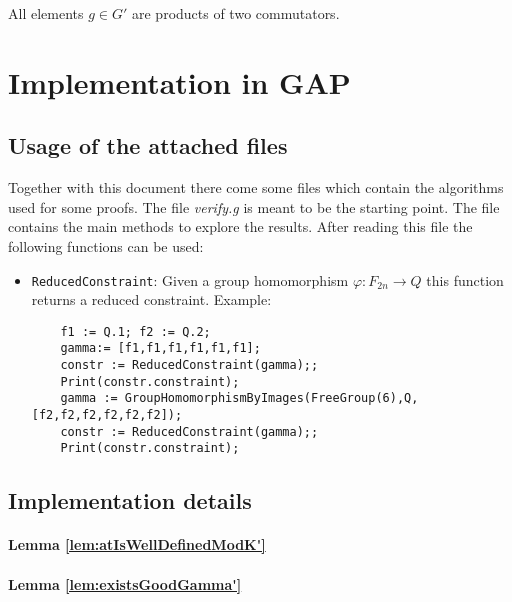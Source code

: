 \documentclass[a4paper,12pt]{article}
\begin{document}
\begin{cor}
 All elements $g\in G'$ are products of two commutators.
\end{cor}

\section{Implementation in GAP}
\subsection{Usage of the attached files}
Together with this document there come some files which contain the algorithms used for some proofs.
The file \emph{verify.g} is meant to be the starting point. The file contains the main methods to explore the results.
After reading this file the following functions can be used:
\begin{itemize}
 \item \lstinline{ReducedConstraint}: Given a group homomorphism $\varphi\colon F_{2n} \to Q$ this function returns a reduced constraint.
 Example: 
 \begin{lstlisting}
    f1 := Q.1; f2 := Q.2;
    gamma:= [f1,f1,f1,f1,f1,f1];
    constr := ReducedConstraint(gamma);;
    Print(constr.constraint);
    gamma := GroupHomomorphismByImages(FreeGroup(6),Q,[f2,f2,f2,f2,f2,f2]);
    constr := ReducedConstraint(gamma);;
    Print(constr.constraint);
\end{lstlisting} 
\end{itemize}

\subsection{Implementation details}
\paragraph{Lemma \ref{lem:atIsWellDefinedModK'}}
\paragraph{Lemma \ref{lem:existsGoodGamma'}}

{}

\appendix
% 
%
\end{document}
